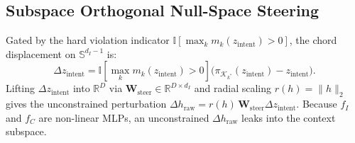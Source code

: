 \documentclass[11pt,twocolumn,a4paper]{article}
\begin{document}
\subsection{Subspace Orthogonal Null-Space Steering}
Gated by the hard violation indicator $\mathbb{I}[\max_k m_k(z_{\text{intent}}) > 0]$, the chord displacement on $\mathbb{S}^{d_I-1}$ is:
\begin{equation}
    \Delta z_{\text{intent}} = \mathbb{I}\!\left[\max_k m_k(z_{\text{intent}}) > 0\right] \big(\pi_{\mathcal{K}_{k^*}}(z_{\text{intent}}) - z_{\text{intent}}\big).
    \label{eq:delta_z}
\end{equation}
Lifting $\Delta z_{\text{intent}}$ into $\mathbb{R}^D$ via $\mathbf{W}_{\text{steer}} \in \mathbb{R}^{D \times d_I}$ and radial scaling $r(h) = \|h\|_2$ gives the unconstrained perturbation $\Delta h_{\text{raw}} = r(h)\,\mathbf{W}_{\text{steer}}\Delta z_{\text{intent}}$. Because $f_I$ and $f_C$ are non-linear MLPs, an unconstrained $\Delta h_{\text{raw}}$ leaks into the context subspace.
\end{document}
